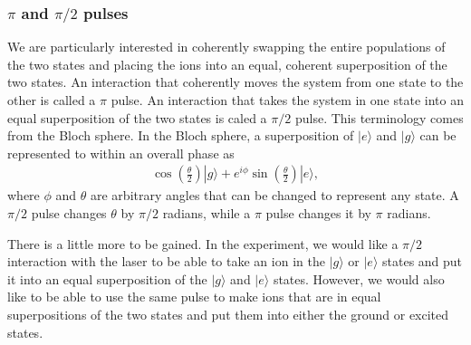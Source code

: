 \subsubsection{$\pi$ and $\pi/2$ pulses}
We are particularly interested in coherently swapping the entire populations of the two states and placing the ions into an equal, coherent superposition of the two states.
An interaction that coherently moves the system from one state to the other is called a $\pi$ pulse. An interaction that takes the system in one state into an equal superposition of the two states is caled a $\pi/2$ pulse. This terminology comes from the Bloch sphere. In the Bloch sphere, a superposition of $|e\rangle$ and $|g\rangle$ can be represented to within an overall phase as 
\begin{multline}
\cos\left(\frac{\theta}{2}\right)|g\rangle+
e^{i\phi}\sin\left(\frac{\theta}{2}\right)|e\rangle,
\end{multline}
where $\phi$ and $\theta$ are arbitrary angles that can be changed to represent any state. A $\pi/2$ pulse changes $\theta$ by $\pi/2$ radians, while a $\pi$ pulse changes it by $\pi$ radians.

There is a little more to be gained. In the experiment, we would like a $\pi/2$ interaction with the laser to be able to take an ion in the $|g\rangle$ or $|e\rangle$ states and put it into an equal superposition of the $|g\rangle$ and $|e\rangle$ states. However, we would also like to be able to use the same pulse to make ions that are in equal superpositions of the two states and put them into either the ground or excited states.


